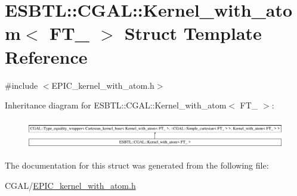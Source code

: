 \hypertarget{structESBTL_1_1CGAL_1_1Kernel__with__atom}{}\section{E\+S\+B\+TL\+:\+:C\+G\+AL\+:\+:Kernel\+\_\+with\+\_\+atom$<$ F\+T\+\_\+ $>$ Struct Template Reference}
\label{structESBTL_1_1CGAL_1_1Kernel__with__atom}


{\ttfamily \#include $<$E\+P\+I\+C\+\_\+kernel\+\_\+with\+\_\+atom.\+h$>$}

Inheritance diagram for E\+S\+B\+TL\+:\+:C\+G\+AL\+:\+:Kernel\+\_\+with\+\_\+atom$<$ F\+T\+\_\+ $>$\+:\begin{figure}[H]
\begin{center}
\leavevmode
\includegraphics[height=1.293303cm]{structESBTL_1_1CGAL_1_1Kernel__with__atom}
\end{center}
\end{figure}


The documentation for this struct was generated from the following file\+:\begin{DoxyCompactItemize}
\item 
C\+G\+A\+L/\hyperlink{EPIC__kernel__with__atom_8h}{E\+P\+I\+C\+\_\+kernel\+\_\+with\+\_\+atom.\+h}\end{DoxyCompactItemize}
